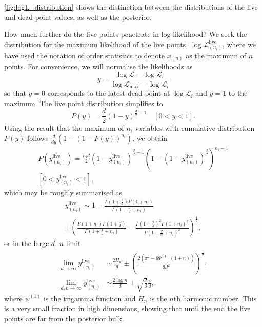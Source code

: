 \documentclass[usenatbib]{mnras}
\newcommand{\Like}{\mathcal{L}}
\begin{document}
\cref{fig:logL_distribution} shows the distinction between the distributions of the live and dead point values, as well as the posterior. 
\par
How much further do the live points penetrate in log-likelihood? We seek the distribution for the maximum likelihood of the live points, $\log\Like_{(n_i)}^{\mathrm{live}}$, where we have used the notation of order statistics to denote $x_{(n)}$ as the maximum of $n$ points.  For convenience, we will normalise the likelihoods as
\begin{equation}
    y = \frac{\log\mathcal{L}-\log\mathcal{L}_i}{\log\mathcal{L}_\mathrm{max}-\log\mathcal{L}_i}
    \label{eq:normalised_likelihood}
\end{equation}
so that $y=0$ corresponds to the latest dead point at $\log\Like_i$ and $y=1$ to the maximum. The live point distribution simplifies to
\begin{equation}
    P(y) = \frac{d}{2}(1-y)^{\frac{d}{2}-1} \quad [0<y<1].
    \label{eq:Py}
\end{equation}
Using the result that the maximum of $n_i$ variables with cumulative distribution $F(y)$ follows $\frac{d}{dy}( 1- (1-F(y))^{n_i})$, we obtain
\begin{multline}
    P(y_{(n_i)}^\mathrm{live}) = \frac{n_i d}{2}(1-y_{(n_i)}^\mathrm{live})^{\frac{d}{2}-1}\left(1-(1-y_{(n_i)}^\mathrm{live})^{\frac{d}{2}}\right)^{n_i-1}\\ 
    [0<y_{(n_i)}^\mathrm{live}<1],
    \label{eq:Pyhat}
\end{multline}
which may be roughly summarised as
\begin{multline}
    y_{(n_i)}^\mathrm{live} \sim 1-\frac{\Gamma(1+\frac{2}{d})\Gamma(1+n_i)}{\Gamma(1+\frac{2}{d}+n_i)} \\
     \pm \left( \frac{\Gamma(1+n_i)\Gamma(1+\frac{4}{d})}{\Gamma(1+\frac{4}{d}+n_i)} - \frac{\Gamma(1+\frac{2}{d})^2 \Gamma(1+n_i)^2}{\Gamma(1+\frac{2}{d}+n_i)^2}\right)^{\frac{1}{2}},
    \label{eq:ymax}
\end{multline}
or in the large $d$, $n$ limit
\begin{align}
    \lim_{d\to\infty} y_{(n_i)}^\mathrm{live} &\sim \frac{2H_n}{d} \pm \left(\frac{2(\pi^2 - 6\Psi^{(1)}(1+n))}{3d^2}\right)^{\frac{1}{2}},
    \label{eq:ymaxd}\\
    \lim_{d,n\to\infty} y_{(n_i)}^\mathrm{live} &\sim \frac{2\log n}{d} \pm \sqrt{\frac{2}{3}}\frac{\pi}{d},
    \label{eq:ymaxdn}
\end{align}
where $\psi^{(1)}$ is the trigamma function and $H_n$ is the $n$th harmonic number. This is a very small fraction in high dimensions, showing that until the end the live points are far from the posterior bulk. 
\end{document}
